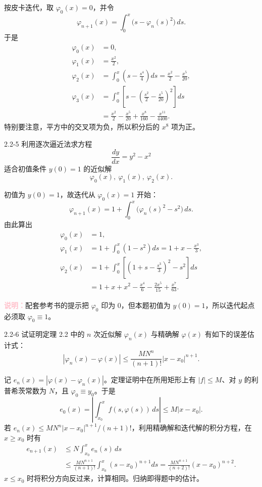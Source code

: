 \documentclass[UTF8,a4paper,11pt]{ctexart}
\newcommand{\note}[1]{\par\smallskip\noindent\textcolor{pink}{\bfseries 说明：}#1\par\smallskip}
\begin{document}
\begin{solution}
按皮卡迭代，取 $\varphi_0(x)=0$，并令
\[
\varphi_{n+1}(x)=\int_0^x\bigl(s-\varphi_n(s)^2\bigr)\,ds.
\]
于是
\[
\begin{aligned}
\varphi_0(x)&=0,\\
\varphi_1(x)&=\frac{x^2}{2},\\
\varphi_2(x)&=\int_0^x\left(s-\frac{s^4}{4}\right)ds
=\frac{x^2}{2}-\frac{x^5}{20},\\
\varphi_3(x)&=\int_0^x\left[s-\left(\frac{s^2}{2}-\frac{s^5}{20}\right)^2\right]ds\\
&=\boxed{\frac{x^2}{2}-\frac{x^5}{20}+\frac{x^8}{160}-\frac{x^{11}}{4400}}.
\end{aligned}
\]
特别要注意，平方中的交叉项为负，所以积分后的 $x^8$ 项为正。
\end{solution}

\begin{problem}{2.2-5}
利用逐次逼近法求方程
  \[
    \frac{dy}{dx}=y^2-x^2
  \]
  适合初值条件 $y(0)=1$ 的近似解
  \[
    \varphi_0(x),\ \varphi_1(x),\ \varphi_2(x).
  \]
\end{problem}

\begin{solution}
初值为 $y(0)=1$，故迭代从 $\varphi_0(x)=1$ 开始：
\[
\varphi_{n+1}(x)=1+\int_0^x\bigl(\varphi_n(s)^2-s^2\bigr)\,ds.
\]
由此算出
\[
\begin{aligned}
\varphi_0(x)&=1,\\
\varphi_1(x)&=1+\int_0^x(1-s^2)ds
=1+x-\frac{x^3}{3},\\
\varphi_2(x)&=1+\int_0^x\left[\left(1+s-\frac{s^3}{3}\right)^2-s^2\right]ds\\
&=\boxed{1+x+x^2-\frac{x^4}{6}-\frac{2x^5}{15}+\frac{x^7}{63}}.
\end{aligned}
\]
\note{配套参考书的提示把 $\varphi_0$ 印为 $0$，但本题初值为 $y(0)=1$，所以迭代起点必须取 $\varphi_0\equiv1$。}
\end{solution}

\begin{problem}{2.2-6}
试证明定理 2.2 中的 $n$ 次近似解 $\varphi_n(x)$ 与精确解 $\varphi(x)$ 有如下的误差估计式：
  \[
    |\varphi_n(x)-\varphi(x)|
    \le \frac{MN^n}{(n+1)!}|x-x_0|^{n+1}.
  \]
\end{problem}

\begin{solution}
记 $e_n(x)=|\varphi(x)-\varphi_n(x)|$。定理证明中在所用矩形上有 $|f|\le M$、对 $y$ 的利普希茨常数为 $N$，且 $\varphi_0\equiv y_0$。于是
\[
e_0(x)=\left|\int_{x_0}^x f(s,\varphi(s))\,ds\right|\le M|x-x_0|.
\]
若 $e_n(x)\le MN^n|x-x_0|^{n+1}/(n+1)!$，利用精确解和迭代解的积分方程，在 $x\ge x_0$ 时有
\[
\begin{aligned}
e_{n+1}(x)&\le N\int_{x_0}^x e_n(s)\,ds\\
&\le\frac{MN^{n+1}}{(n+1)!}\int_{x_0}^x(s-x_0)^{n+1}ds
=\frac{MN^{n+1}}{(n+2)!}(x-x_0)^{n+2}.
\end{aligned}
\]
$x\le x_0$ 时将积分方向反过来，计算相同。归纳即得题中的估计。
\end{solution}
\end{document}
